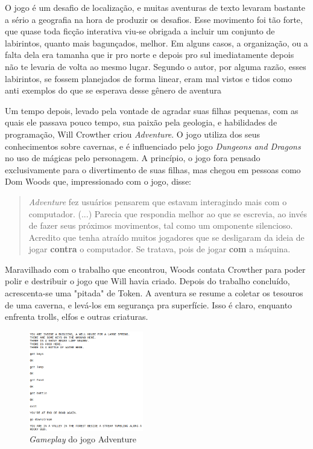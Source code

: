 O jogo é um desafio de localização, e muitas aventuras de texto levaram bastante
a sério a geografia na hora de produzir os desafios. Esse movimento foi tão
forte, que quase toda ficção interativa viu-se obrigada a incluir um conjunto de
labirintos, quanto mais bagunçados, melhor. Em alguns casos, a organização, ou a
falta dela era tamanha que ir pro norte e depois pro sul imediatamente depois não
te levaria de volta ao mesmo lugar. Segundo o autor, por alguma razão, esses
labirintos, se fossem planejados de forma linear, eram mal vistos e tidos como
anti exemplos do que se esperava desse gênero de aventura

Um tempo depois, levado pela vontade de agradar suas filhas pequenas,
com as quais ele passava pouco tempo, sua paixão pela geologia, e habilidades de
programação, Will Crowther criou \emph{Adventure}. O jogo utiliza dos seus
conhecimentos sobre cavernas, e é influenciado pelo jogo
\emph{Dungeons and Dragons} no uso de mágicas pelo personagem. A princípio, o
jogo fora pensado exclusivamente para o divertimento de suas filhas, mas chegou
em pessoas como Dom Woods que, impressionado com o jogo, disse:
\begin{quotation}
\emph{Adventure} fez usuários pensarem que estavam interagindo mais com o
computador. (...) Parecia que respondia melhor ao que se escrevia, ao invés de
fazer seus próximos movimentos, tal como um omponente silencioso. Acredito que
tenha atraído muitos jogadores que se desligaram da ideia de jogar
\textbf{contra} o computador. Se tratava, pois de jogar \textbf{com} a máquina.
\end{quotation}

Maravilhado com o trabalho que encontrou, Woods contata Crowther para poder
polir e destribuir o jogo que Will havia criado. Depois do trabalho concluído,
acrescenta-se uma "pitada" de Token. A aventura se resume a coletar os tesouros
de uma caverna, e levá-los em segurança pra superfície. Isso é claro, enquanto
enfrenta trolls, elfos e outras criaturas.

\begin{figure}[htb]
  \includegraphics[width=5cm]{figuras/adventure}
  \caption{\label{fig:adventure} \emph{Gameplay} do jogo Adventure}
\end{figure}

